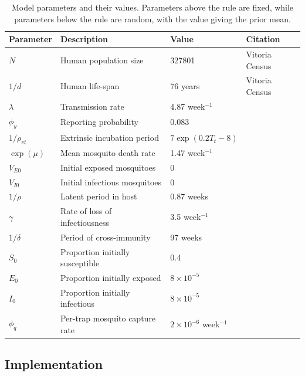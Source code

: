 \documentclass[10pt,letterpaper]{article}
\begin{document}
\begin{table}[!ht]
\label{parameters}
\begin{adjustwidth}{-2.25in}{0in} 
\begin{center}
\caption{Model parameters and their values.  Parameters above the rule are fixed, while parameters below the rule are random, with the value giving the prior mean.}
\begin{tabular}{llll}
Parameter & Description & Value & Citation\\
\hline
$N$ & Human population size & 327801 & Vitoria Census\\
$1/d$ & Human life-span & 76 years & Vitoria Census\\
$\lambda$ & Transmission rate & 4.87 week$^{-1}$ & \cite{Scott2000}\\
$\phi_y$ & Reporting probability & 0.083 & \cite{Silva2016}\\
$1/\rho_{vt}$ & Extrinsic incubation period & $7\exp \left( 0.2 T_t - 8 \right)$ & \cite{Chan2012}\\
$\exp(\mu)$ & Mean mosquito death rate & 1.47 week$^{-1}$ & \cite{Brady2013} \\
$V_{E0}$ & Initial exposed mosquitoes &  0 & \\
$V_{I0}$ & Initial infectious mosquitoes & 0 & \\
\hline
$1/\rho$ & Latent period in host & 0.87 weeks  & \cite{Chan2012}\\
$\gamma$ & Rate of loss of infectiousness & 3.5 week$^{-1}$ & \cite{Nguyet2013}\\
$1/\delta$ & Period of cross-immunity & 97 weeks &  \cite{Reich2013}\\
$S_0$ & Proportion initially susceptible & 0.4 & \cite{Cardoso2011a} \\
$E_0$ & Proportion initially exposed & $8\times 10 ^ {-5}$ & \\
$I_0$ & Proportion initially infectious & $8\times 10 ^ {-5}$ & \\
$\phi_q$ & Per-trap mosquito capture rate & $2 \times 10^{-6}$ week$^{-1}$ & 
\end{tabular}
\end{center}
\end{adjustwidth}
\end{table}

\subsection*{Implementation}
 
\end{document}
